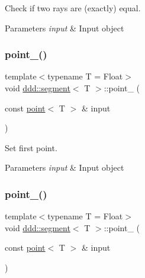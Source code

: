 Check if two rays are (exactly) equal. 


\begin{DoxyParams}{Parameters}
{\em input} & Input object \\
\hline
\end{DoxyParams}
\mbox{\label{classddd_1_1segment_acb01f37ab6c2bf4313d627246ea97a56}} 
\subsubsection{\texorpdfstring{point\+\_()}{point\_1()}}
{\footnotesize\ttfamily template$<$typename T = Float$>$ \\
void \hyperlink{classddd_1_1segment}{ddd\+::segment}$<$ T $>$\+::point\+\_ (\begin{DoxyParamCaption}\item[{const \hyperlink{classddd_1_1point}{point}$<$ T $>$ \&}]{input }\end{DoxyParamCaption})\hspace{0.3cm}{\ttfamily [inline]}}



Set first point. 


\begin{DoxyParams}{Parameters}
{\em input} & Input object \\
\hline
\end{DoxyParams}
\mbox{\label{classddd_1_1segment_a7b2abb8f44935ba3a72c663c75d802d3}} 
\subsubsection{\texorpdfstring{point\+\_()}{point\_2()}}
{\footnotesize\ttfamily template$<$typename T = Float$>$ \\
void \hyperlink{classddd_1_1segment}{ddd\+::segment}$<$ T $>$\+::point\+\_ (\begin{DoxyParamCaption}\item[{const \hyperlink{classddd_1_1point}{point}$<$ T $>$ \&}]{input }\end{DoxyParamCaption})\hspace{0.3cm}{\ttfamily [inline]}}



